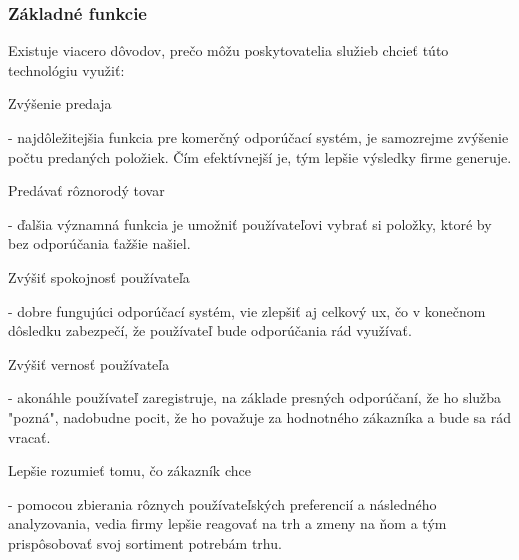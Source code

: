 \subsubsection{Základné funkcie}
Existuje viacero dôvodov, prečo môžu poskytovatelia služieb chcieť túto technológiu využiť: 
 \begin{itemize}[leftmargin=*]
{\bf \item Zvýšenie predaja} - najdôležitejšia funkcia pre komerčný odporúčací systém, je samozrejme zvýšenie počtu predaných položiek. Čím efektívnejší je, tým lepšie výsledky firme generuje. \cite{rs1}

{\bf \item Predávať rôznorodý tovar} - ďalšia významná funkcia je umožniť používateľovi vybrať si položky, ktoré by bez odporúčania ťažšie našiel. \cite{rs1}
 
{\bf \item Zvýšiť spokojnosť používateľa} - dobre fungujúci odporúčací systém, vie zlepšiť aj celkový \acrshort{ux}, čo v konečnom dôsledku zabezpečí, že používateľ bude odporúčania rád využívať. \cite{rs1}

{\bf \item Zvýšiť vernosť používateľa} - akonáhle používateľ zaregistruje, na základe presných odporúčaní, že ho služba "pozná", nadobudne pocit, že ho považuje za hodnotného zákazníka a bude sa rád vracať. \cite{rs1}
	
{\bf \item Lepšie rozumieť tomu, čo zákazník chce} - pomocou zbierania rôznych používateľských preferencií a následného analyzovania, vedia firmy lepšie reagovať na trh a zmeny na ňom a tým prispôsobovať svoj sortiment potrebám trhu. \cite{rs1} \newline

\end{itemize} 


